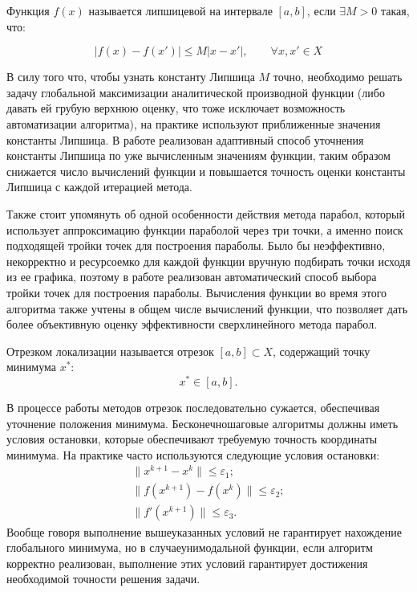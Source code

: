 \begin{definition}
Функция $f(x)$ называется липшицевой на интервале $[a,b]$, если  $\exists M>0$ такая, что:
\end{definition}

\begin{equation}
|f(x) - f(x')| \leq M|x - x'|, \qquad \forall x, x' \in X
\end{equation}

В силу того что, чтобы узнать константу Липшица $M$ точно, необходимо решать задачу 
глобальной максимизации аналитической производной функции 
(либо давать ей грубую верхнюю оценку, что тоже исключает возможность автоматизации алгоритма),
на практике используют приближенные значения константы Липшица. В работе реализован адаптивный
способ уточнения константы Липшица по уже вычисленным значениям функции, таким образом снижается 
число вычислений функции и повышается точность оценки константы Липшица с каждой итерацией метода.

Также стоит упомянуть об одной особенности действия метода парабол, который использует аппроксимацию
функции параболой через три точки, а именно поиск подходящей тройки точек для построения параболы.
Было бы неэффективно, некорректно и ресурсоемко для каждой функции вручную подбирать точки
исходя из ее графика, поэтому в работе реализован автоматический способ выбора тройки точек для
построения параболы. Вычисления функции во время этого алгоритма также учтены в общем числе вычислений
функции, что позволяет дать более объективную оценку эффективности сверхлинейного метода парабол.

\begin{definition}
Отрезком локализации называется отрезок
\([a,b] \subset X\), содержащий точку минимума \(x^*\):
\[
x^* \in [a,b].
\]
\end{definition}

В процессе работы методов отрезок последовательно сужается, обеспечивая уточнение
положения минимума. Бесконечношаговые алгоритмы должны иметь условия остановки,
которые обеспечивают требуемую точность координаты минимума. 
На практике часто используются следующие условия остановки:
\begin{gather}
    \|x^{k+1} - x^k\| \leq \varepsilon_1; \\
    \|f(x^{k+1}) - f(x^k)\| \leq \varepsilon_2; \\
    \|f'(x^{k+1})\| \leq \varepsilon_3.
\end{gather}
Вообще говоря выполнение вышеуказанных условий не гарантирует нахождение
глобального минимума, но в случаеунимодальной функции, 
если алгоритм корректно реализован, выполнение этих условий
гарантирует достижения необходимой точности решения задачи.
